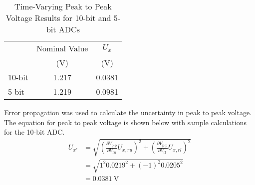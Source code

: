 \begin{table}[h]
   \centering
   \caption{Time-Varying Peak to Peak Voltage Results for 10-bit and 5-bit ADCs}
   \label{tab:time-varying-peak-to-peak-voltage-results}
   \begin{tabular}{lcc}
   \toprule
   & Nominal Value & $U_x$ \\
   & (V)           & (V)   \\
   \midrule
   10-bit & 1.217 & 0.0381  \\
   5-bit  & 1.219 & 0.0981   \\
   \bottomrule
   \end{tabular}
\end{table}
\FloatBarrier
\noindent Error propagation was used to calculate the uncertainty in peak to peak voltage. The equation for peak to peak voltage is shown below with 
sample calculations for the 10-bit ADC.
\[
\begin{aligned}
   U_{x'} &= \sqrt{\left(\frac{\partial V_{\text{p-p}}}{\partial V_{\text{ru}}} U_{x, ru}\right)^2 + \left(\frac{\partial V_{\text{p-p}}}{\partial V_{\text{rl}}} U_{x, rl}\right)^2} \\
          &= \sqrt{1^2 \qty{0.0219}^2 + (-1)^2 \qty{0.0205}^2} \\
            &= \boxed{\qty{0.0381}{\volt}}
\end{aligned}
\]





